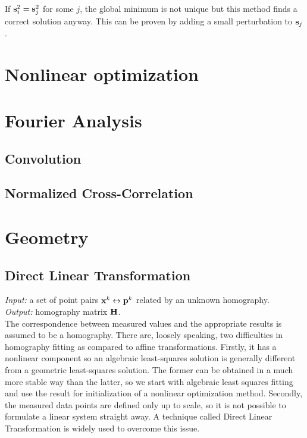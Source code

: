 If $\mathbf{s}_i^2 = \mathbf{s}_j^2$ for some $j$, the global minimum is not unique but this method finds a correct solution anyway.
This can be proven by adding a small perturbation to $\mathbf{s}_j$.

\section{Nonlinear optimization}



\section{Fourier Analysis}

\subsection{Convolution}

\subsection{Normalized Cross-Correlation}


\section{Geometry}

\subsection{Direct Linear Transformation}

\textit{Input:} a set of point pairs $\mathbf{x}^k \leftrightarrow \mathbf{p}^k$ related by an unknown homography.\\
\textit{Output:} homography matrix $\mathbf{H}$.\\

The correspondence between measured values and the appropriate results is assumed to be a homography.
There are, loosely speaking, two difficulties in homography fitting as compared to affine transformations.
Firstly, it has a nonlinear component so an algebraic least-squares solution is generally different from a geometric least-squares solution.
The former can be obtained in a much more stable way than the latter, so we start with algebraic least squares fitting and use the result for initialization of a nonlinear optimization method.
Secondly, the measured data points are defined only up to scale, so it is not possible to formulate a linear system straight away.
A technique called Direct Linear Transformation is widely used to overcome this issue.

